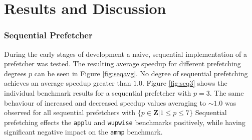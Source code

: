 \section{Results and Discussion}
\label{sec:results-and-discussion}
%

\subsubsection{Sequential Prefetcher}
During the early stages of development a naive, sequential implementation of a prefetcher was tested.
The resulting average speedup for different prefetching degrees $p$ can be seen in Figure \ref{fig:seqavg}.
No degree of sequential prefetching achieves an average speedup greater than $1.0$.
Figure \ref{fig:seq3} shows the individual benchmark results for a sequential prefetcher with $p = 3$.
The same behaviour of increased and decreased speedup values averaging to $\sim 1.0$ was observed for all sequential prefetchers with $\{p \in \mathbf{Z} | 1 \leq p \leq 7\}$
Sequential prefetching effects the \texttt{applu} and \texttt{wupwise} benchmarks positively, while having significant negative impact on the \texttt{ammp} benchmark.

\begin{figure*}
  
  \caption{Average speedup as a function of degree for the sequential prefetcher.}
  \label{fig:seqavg}
\end{figure*}

\begin{figure*}
  
  \caption{Performance of sequential prefetcher with $p = 3$ across benchmarks.}
  \label{fig:seq3}
\end{figure*}

